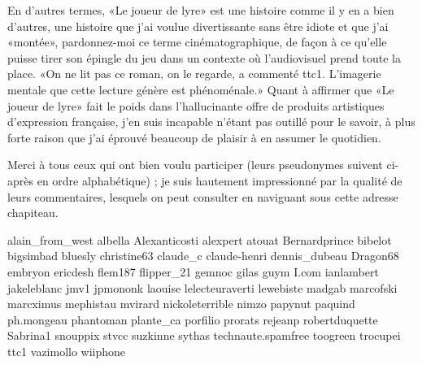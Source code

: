 \begin{Postface}
En d’autres termes, «Le joueur de lyre» est une histoire comme il y en a bien d’autres, une histoire que j’ai voulue divertissante sans être idiote et que j’ai «montée», pardonnez-moi ce terme cinématographique, de façon à ce qu’elle puisse tirer son épingle du jeu dans un contexte où l’audiovisuel prend toute la place. «On ne lit pas ce roman, on le regarde, a commenté ttc1. L’imagerie mentale que cette lecture génère est phénoménale.» Quant à affirmer que «Le joueur de lyre» fait le poids dans l’hallucinante offre de produits artistiques d’expression française, j’en suis incapable n’étant pas outillé pour le savoir, à plus forte raison que j’ai éprouvé beaucoup de plaisir à en assumer le quotidien.

Merci à tous ceux qui ont bien voulu participer (leurs pseudonymes suivent ci-après en ordre alphabétique) ; je suis hautement impressionné par la qualité de leurs commentaires, lesquels on peut consulter en naviguant sous cette adresse chapiteau.

    alain_from_west
    albella
    Alexanticosti
    alexpert
    atouat
    Bernardprince
    bibelot
    bigsimbad
    bluesly
    christine63
    claude_c
    claude-henri
    dennis_dubeau
    Dragon68
    embryon
    ericdesh
    flem187
    flipper_21
    gemnoc
    gilas
    guym
    I.com
    ianlambert
    jakeleblanc
    jmv1
    jpmononk
    laouise
    lelecteuraverti
    lewebiste
    madgab
    marcofski
    marcximus
    mephistau
    mvirard
    nickoleterrible
    nimzo
    papynut
    paquind
    ph.mongeau
    phantoman
    plante_ca
    porfilio
    prorats
    rejeanp
    robertduquette
    Sabrina1
    snouppix
    stvcc
    suzkinne
    sythas
    technaute.spamfree
    toogreen
    trocupei
    ttc1
    vazimollo
    wiiphone

\end{Postface}